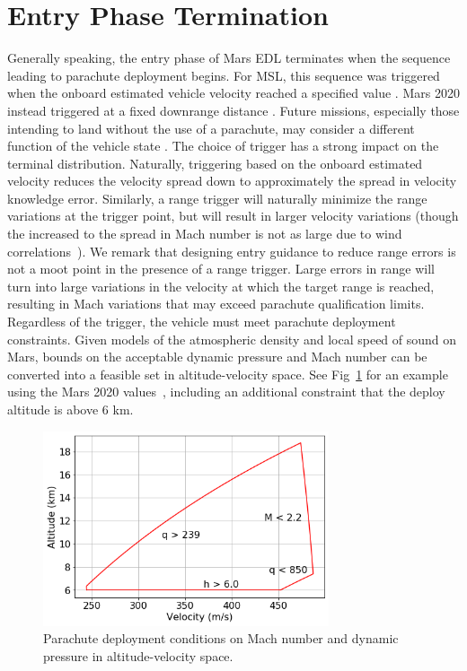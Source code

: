 \section{Entry Phase Termination}\label{Subsec:EntryTermination}
Generally speaking, the entry phase of Mars EDL terminates when the sequence leading to parachute deployment begins. For MSL, this sequence was triggered when the onboard estimated vehicle velocity reached a specified value \cite{MSL_EDL2}. Mars 2020 instead triggered at a fixed downrange distance \cite{TriggerComparison2020}. Future missions, especially those intending to land without the use of a parachute, may consider a different function of the vehicle state \cite{LuAdaptiveEDL,NoyesSRP}. The choice of trigger has a strong impact on the terminal distribution. Naturally, triggering based on the onboard estimated velocity reduces the velocity spread down to approximately the spread in velocity knowledge error. Similarly, a range trigger will naturally minimize the range variations at the trigger point, but will result in larger velocity variations (though the increased to the spread in Mach number is not as large due to wind correlations~\cite{TriggerComparison2020}). We remark that designing entry guidance to reduce range errors is not a moot point in the presence of a range trigger. Large errors in range will turn into large variations in the velocity at which the target range is reached, resulting in Mach variations that may exceed parachute qualification limits.
Regardless of the trigger, the vehicle must meet parachute deployment constraints. Given models of the atmospheric density and local speed of sound on Mars, bounds on the acceptable dynamic pressure and Mach number can be converted into a feasible set in altitude-velocity space. See Fig~\ref{Fig:ParachuteBox} for an example using the Mars 2020 values~\cite{M2020_EDL}, including an additional constraint that the deploy altitude is above 6 km.  
\begin{figure}[h!]
	\centering
	\includegraphics[width=0.75\textwidth]{Images/ParachuteBox}
	\caption{Parachute deployment conditions on Mach number and dynamic pressure in altitude-velocity space.}
	\label{Fig:ParachuteBox}
\end{figure}


